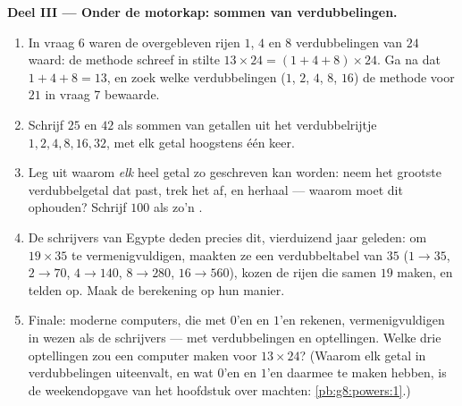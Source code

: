 \begin{problem}
\medskip
\noindent\textbf{Deel III --- Onder de motorkap: sommen van verdubbelingen.}
\begin{enumerate}[resume]
  \item In vraag 6 waren de overgebleven rijen $1$, $4$ en $8$ verdubbelingen
        van $24$ waard: de methode schreef in stilte
        $13 \times 24 = (1 + 4 + 8) \times 24$. Ga na dat $1 + 4 + 8 = 13$, en
        zoek welke verdubbelingen ($1$, $2$, $4$, $8$, $16$) de methode voor
        $21$ in vraag 7 bewaarde.
  \item Schrijf $25$ en $42$ als sommen van getallen uit het verdubbelrijtje
        $1, 2, 4, 8, 16, 32$, met elk getal hoogstens één keer.
  \item Leg uit waarom \emph{elk} heel getal zo geschreven kan worden: neem het
        grootste verdubbelgetal dat past, trek het af, en herhaal --- waarom moet
        dit ophouden? Schrijf $100$ als zo'n .
  \item De schrijvers van Egypte deden precies dit, vierduizend jaar geleden: om
        $19 \times 35$ te vermenigvuldigen, maakten ze een verdubbeltabel van
        $35$ ($1 \to 35$, $2 \to 70$, $4 \to 140$, $8 \to 280$, $16 \to 560$),
        kozen de rijen die samen $19$ maken, en telden op. Maak de berekening op
        hun manier.
  \item Finale: moderne computers, die met $0$'en en $1$'en rekenen,
        vermenigvuldigen in wezen als de schrijvers --- met verdubbelingen en
        optellingen. Welke drie optellingen zou een computer maken voor
        $13 \times 24$? (Waarom elk getal in verdubbelingen uiteenvalt, en wat
        $0$'en en $1$'en daarmee te maken hebben, is de weekendopgave van het
        hoofdstuk over machten: \cref{pb:g8:powers:1}.)
\end{enumerate}
\end{problem}
